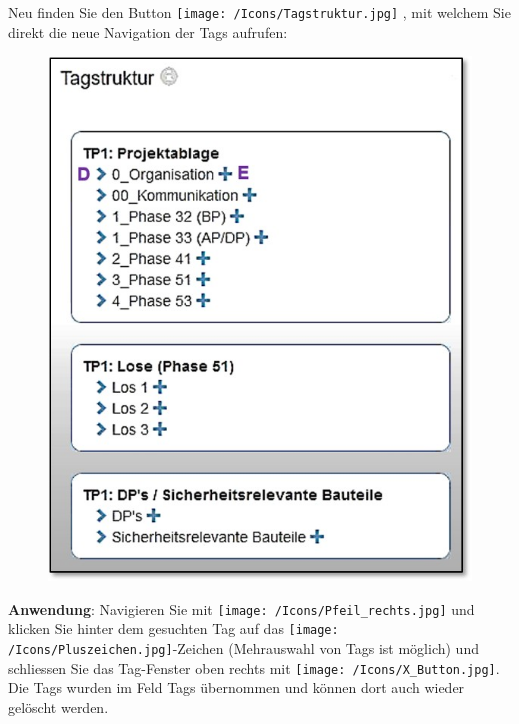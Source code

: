 Neu finden Sie  den Button \texttt{[image: /Icons/Tagstruktur.jpg]} , mit welchem Sie direkt die neue Navigation der Tags aufrufen:


\begin{figure}   %
  \vspace{-23pt}      %
  \begin{center}
    \includegraphics[width=1\linewidth]{../chapters/03_RBS/pictures/04_Dok_Struktur_eingeklappt.jpg}
  \end{center}
  \vspace{-20pt}
  \vspace{-10pt}
\end{figure}

\textbf{Anwendung}: Navigieren Sie mit \texttt{[image: /Icons/Pfeil\_rechts.jpg]}  und klicken Sie hinter dem gesuchten Tag auf das \texttt{[image: /Icons/Pluszeichen.jpg]}-Zeichen  (Mehrauswahl von Tags ist möglich) und schliessen Sie das Tag-Fenster oben rechts mit \texttt{[image: /Icons/X\_Button.jpg]}. Die Tags wurden im Feld Tags übernommen und können dort auch wieder gelöscht werden.

